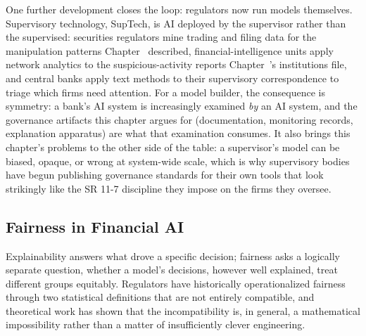 \documentclass[../ai_in_finance]{subfiles}
\begin{document}
One further development closes the loop: regulators now run models themselves. Supervisory technology, SupTech, is AI deployed by the supervisor rather than the supervised: securities regulators mine trading and filing data for the manipulation patterns Chapter~ described, financial-intelligence units apply network analytics to the suspicious-activity reports Chapter~'s institutions file, and central banks apply text methods to their supervisory correspondence to triage which firms need attention. For a model builder, the consequence is symmetry: a bank's AI system is increasingly examined \emph{by} an AI system, and the governance artifacts this chapter argues for (documentation, monitoring records, explanation apparatus) are what that examination consumes. It also brings this chapter's problems to the other side of the table: a supervisor's model can be biased, opaque, or wrong at system-wide scale, which is why supervisory bodies have begun publishing governance standards for their own tools that look strikingly like the SR 11-7 discipline they impose on the firms they oversee.

\subsection{Fairness in Financial AI}
\label{sec:fairness}

Explainability answers what drove a specific decision; fairness asks a logically separate question, whether a model's decisions, however well explained, treat different groups equitably. Regulators have historically operationalized fairness through two statistical definitions that are not entirely compatible, and theoretical work has shown that the incompatibility is, in general, a mathematical impossibility rather than a matter of insufficiently clever engineering.
\end{document}
